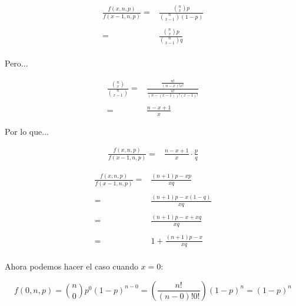 \begin{equation}
  \begin{array}{rr}
  \frac{f(x,n,p)}{f(x-1,n,p)} = & \frac{\binom{n}{x} p}{\binom{n}{x-1} (1-p)} \\
  \\
                              = & \frac{\binom{n}{x} p}{\binom{n}{x-1} q} \\
  \end{array}
\end{equation}

Pero...
  
\begin{equation}
  \begin{array}{rr}
  \frac{\binom{n}{x}}{\binom{n}{x-1}} = & \frac{\frac{n!}{(n-x)!x!}}{\frac{n!}{(n-(x-1))!(x-1)!}} \\
  \\
                                      = & \frac{n-x+1}{x}
  \end{array}
\end{equation}

Por lo que...

\begin{equation}
  \begin{array}{rr}
  \frac{f(x,n,p)}{f(x-1,n,p)} = & \frac{n-x+1}{x} \cdot \frac{p}{q}
  \end{array}
\end{equation}

\begin{equation}
  \begin{array}{rr}
  \frac{f(x,n,p)}{f(x-1,n,p)} = & \frac{(n+1)p - xp}{xq} \\
  \\
                              = & \frac{(n+1)p - x(1-q)}{xq} \\
  \\
                              = & \frac{(n+1)p - x + xq}{xq} \\
  \\
                              = & 1 + \frac{(n+1)p - x}{xq} \\
  \end{array}
  \label{eq:poissonGral}
\end{equation}

Ahora podemos hacer el caso cuando $x=0$:

\begin{equation}
  f(0,n,p) = \binom{n}{0} p^0 (1-p)^{n-0} = (\frac{n!}{(n-0)! 0!})(1-p)^n = (1-p)^n
\end{equation}

